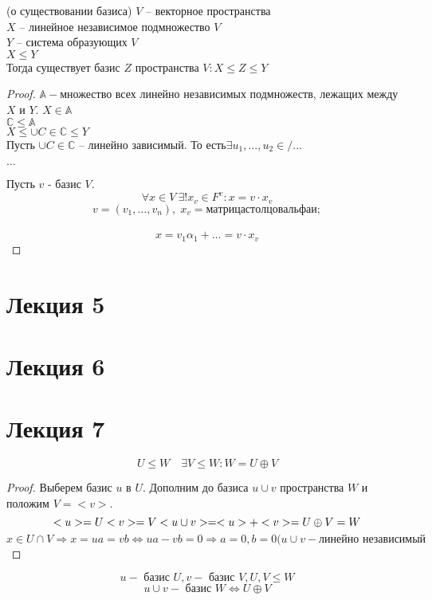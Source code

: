\documentclass[12pt]{report}
\begin{document}
\begin{thm}(о существовании базиса)
$V $ -- векторное пространства \\
$X$  -- линейное независимое подмножество $V$\\
$Y$ -- система образующих $V$\\
$X \le Y$\\
Тогда существует базис $Z$ пространства $V: X \le Z \le Y$
\end{thm}
\begin{proof}
$\mathbb A - $множество всех линейно независимых подмножеств, лежащих между $X$ и $Y$. $X \in \mathbb A$\\
$\mathbb C \le \mathbb A $\\
$X \le \cup {C \in \mathbb C} \le Y$\\
Пусть $\cup {C \in \mathbb C}$ --  линейно зависимый. То есть$ \exists u_1, ...,  u_2 \in /...$

$\ldots$

Пусть $v$ - базис $V$.\\
$$\forall x \in V \: \exists! x_v \in F^v : x = v \cdot x_v$$
$$v = (v_1, \ldots , v_n), \; x_v = матрица столцов альфа и;$$\\
$$x = v_1 \alpha_1 + \ldots = v\cdot x_v$$
\end{proof}

\section{Лекция 5}
\section{Лекция 6}

\section{Лекция 7}
\begin{st}
   $$U \le W \quad \exists V \le W : W=U\oplus V$$ 
\end{st}
\begin{proof}
    Выберем базис $u$ в $U$. Дополним до базиса $u \cup v$ пространства $W$ и положим $V = <v>$. $$<u> = U \\ <v>=V \\ <u \cup v> = <u> + <v> = U \oplus V = W$$
    $$ x \in U \cap V \Rightarrow x = ua = vb \Leftrightarrow ua-vb = 0 \Rightarrow a = 0, b = 0 (u \cup v - \mbox{линейно независимый}$$
\end{proof}
\begin{cor}
    $$ u - \mbox{ базис } U, v - \mbox{ базис } V, U, V \le W$$
    $$u \cup v - \mbox{ базис } W \Leftrightarrow U \oplus V$$
\end{cor}
\end{document}
